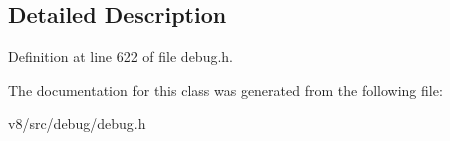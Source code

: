 \subsection{Detailed Description}


Definition at line 622 of file debug.\+h.



The documentation for this class was generated from the following file\+:\begin{DoxyCompactItemize}
\item 
v8/src/debug/debug.\+h\end{DoxyCompactItemize}
